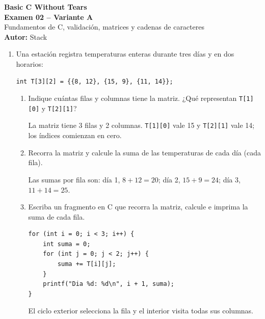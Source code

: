 
\newcommand{\NombreDocumento}{Examen 02 -- Variante A}

\begin{center}
    {\LARGE \textbf{Basic C Without Tears}} \\[0.2cm]
    {\Large \textbf{Examen 02 -- Variante A}} \\[0.12cm]
    \small Fundamentos de C, validación, matrices y cadenas de caracteres \\[0.08cm]
    \textbf{Autor:} Stack
\end{center}
\vspace{0.2cm}
\begin{enumerate}[label=\textbf{\arabic*.}]
\item Una estación registra temperaturas enteras durante tres días y en dos horarios:
\begin{lstlisting}[style=customc, numbers=none]
int T[3][2] = {{8, 12}, {15, 9}, {11, 14}};
\end{lstlisting}
\begin{enumerate}[label=(\alph*)]
\item Indique cuántas filas y columnas tiene la matriz. ¿Qué representan \texttt{T[1][0]} y \texttt{T[2][1]}?
\ifpauta\begin{solucionbox}La matriz tiene 3 filas y 2 columnas. \texttt{T[1][0]} vale 15 y \texttt{T[2][1]} vale 14; los índices comienzan en cero.\end{solucionbox}\else\vspace{1.5cm}\fi
\item Recorra la matriz y calcule la suma de las temperaturas de cada día (cada fila).
\ifpauta\begin{solucionbox}Las sumas por fila son: día 1, $8+12=20$; día 2, $15+9=24$; día 3, $11+14=25$.\end{solucionbox}\else\vspace{2cm}\fi
\item Escriba un fragmento en C que recorra la matriz, calcule e imprima la suma de cada fila.
\ifpauta\begin{solucionbox}\begin{lstlisting}[style=customc]
for (int i = 0; i < 3; i++) {
    int suma = 0;
    for (int j = 0; j < 2; j++) {
        suma += T[i][j];
    }
    printf("Dia %d: %d\n", i + 1, suma);
}
\end{lstlisting}El ciclo exterior selecciona la fila y el interior visita todas sus columnas.\end{solucionbox}\else\vspace{3cm}\fi

\end{enumerate}
\end{enumerate}
